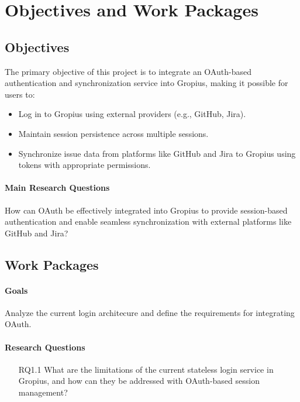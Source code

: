 
\chapter{Objectives and Work Packages}
\label{chap:wp}

\section{Objectives}

The primary objective of this project is to integrate an OAuth-based authentication and synchronization service into Gropius, making it possible for users to:
\begin{itemize}
	\item Log in to Gropius using external providers (e.g., GitHub, Jira).
	\item Maintain session persistence across multiple sessions.
	\item Synchronize issue data from platforms like GitHub and Jira to Gropius using tokens with appropriate permissions.
\end{itemize}
\subsubsection{Main Research Questions}

How can OAuth be effectively integrated into Gropius to provide session-based authentication and enable seamless synchronization
with external platforms like GitHub and Jira?

\section{Work Packages}
\label{sec-workpackages}


\subsubsection{Goals}
Analyze the current login architecure and define the requirements for integrating OAuth.
\subsubsection{Research Questions}
\begin{itemize}
	\item[RQ1.1]
	What are the limitations of the current stateless login service in Gropius, and how can they be addressed with OAuth-based session management?
\end{itemize}

